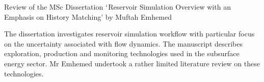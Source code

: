 \documentclass[14pt,twoside]{report}
\begin{document}

\bigskip

\begin{center}
{\Large Review of the MSc Dissertation $\lq$Reservoir Simulation Overview with an Emphasis on History Matching' by Muftah Emhemed}
\end{center}

\medskip

The dissertation investigates reservoir simulation workflow with particular focus on the uncertainty associated with flow dynamics. The manuscript describes exploration, production and monitoring technologies used in the subsurface energy sector. Mr Emhemed undertook a rather limited literature review on these technologies.
\end{document}
